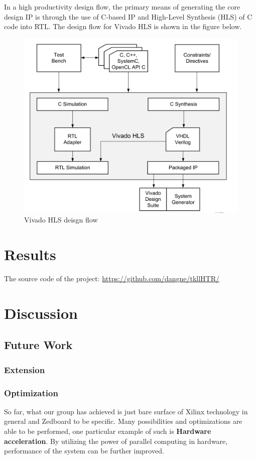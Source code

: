 \documentclass[12pt, a4paper, oneside]{article}
\begin{document}
    		In a high productivity design flow, the primary means of generating the core design IP is
    		through the use of C-based IP and High-Level Synthesis (HLS) of C code into RTL. The design flow for Vivado HLS is shown in the figure below. 
    		\begin{figure}[H]
    			\begin{center}
    				\includegraphics[scale=0.5]{HLS.png}
    				\caption{Vivado HLS deisgn flow}
    				\label{fig:Vivado HLS deisgn flow}
    			\end{center}
    		\end{figure}
    		
    \section{Results}
    	The source code of the project: \url{https://github.com/dangne/tkllHTR/}
    	
    \section{Discussion}
        \subsection{Future Work}
            \subsubsection{Extension}
            \subsubsection{Optimization}
                So far, what our group has achieved is just bare surface of Xilinx technology in general and Zedboard to be specific. Many possibilities and optimizations are able to be performed, one particular example of such is \textbf{Hardware acceleration}. By utilizing the power of parallel computing in hardware, performance of the system can be further improved. 
\end{document}
